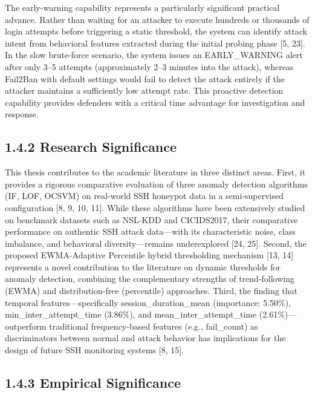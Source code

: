 \documentclass[
  a4paper]{report}
\begin{document}
The early-warning capability represents a particularly significant
practical advance. Rather than waiting for an attacker to execute
hundreds or thousands of login attempts before triggering a static
threshold, the system can identify attack intent from behavioral
features extracted during the initial probing phase {[}5, 23{]}. In the
slow brute-force scenario, the system issues an EARLY\_WARNING alert
after only 3--5 attempts (approximately 2--3 minutes into the attack),
whereas Fail2Ban with default settings would fail to detect the attack
entirely if the attacker maintains a sufficiently low attempt rate. This
proactive detection capability provides defenders with a critical time
advantage for investigation and response.

\subsection{1.4.2 Research Significance}\label{research-significance}

This thesis contributes to the academic literature in three distinct
areas. First, it provides a rigorous comparative evaluation of three
anomaly detection algorithms (IF, LOF, OCSVM) on real-world SSH honeypot
data in a semi-supervised configuration {[}8, 9, 10, 11{]}. While these
algorithms have been extensively studied on benchmark datasets such as
NSL-KDD and CICIDS2017, their comparative performance on authentic SSH
attack data---with its characteristic noise, class imbalance, and
behavioral diversity---remains underexplored {[}24, 25{]}. Second, the
proposed EWMA-Adaptive Percentile hybrid thresholding mechanism {[}13,
14{]} represents a novel contribution to the literature on dynamic
thresholds for anomaly detection, combining the complementary strengths
of trend-following (EWMA) and distribution-free (percentile) approaches.
Third, the finding that temporal features---specifically
session\_duration\_mean (importance: 5.50\%), min\_inter\_attempt\_time
(3.86\%), and mean\_inter\_attempt\_time (2.61\%)---outperform
traditional frequency-based features (e.g., fail\_count) as
discriminators between normal and attack behavior has implications for
the design of future SSH monitoring systems {[}8, 15{]}.

\subsection{1.4.3 Empirical Significance}\label{empirical-significance}
\end{document}
